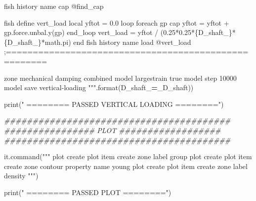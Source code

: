 \documentclass[a4paper, nobind]{templates/ociamthesis}
\newenvironment{Shaded}{\begin{snugshade}}{\end{snugshade}}
\newcommand{\BuiltInTok}[1]{#1}
\newcommand{\CommentTok}[1]{\textcolor[rgb]{0.56,0.35,0.01}{\textit{#1}}}
\newcommand{\NormalTok}[1]{#1}
\newcommand{\OperatorTok}[1]{\textcolor[rgb]{0.81,0.36,0.00}{\textbf{#1}}}
\newcommand{\SpecialCharTok}[1]{\textcolor[rgb]{0.00,0.00,0.00}{#1}}
\newcommand{\StringTok}[1]{\textcolor[rgb]{0.31,0.60,0.02}{#1}}
\renewenvironment{Shaded}
{
  \vspace{10pt}%
  \begin{snugshade}%
}{%
  \end{snugshade}%
  \vspace{8pt}%
}
\begin{document}
\begin{Shaded}
\begin{Highlighting}[]
\StringTok{fish history name \textquotesingle{}cap\textquotesingle{} @find\_cap}

\StringTok{fish define vert\_load}
\StringTok{    local yftot = 0.0}
\StringTok{    loop foreach gp cap}
\StringTok{        yftot = yftot + gp.force.unbal.y(gp)}
\StringTok{    end\_loop}
\StringTok{    vert\_load = yftot / (0.25*0.25*}\SpecialCharTok{\{D\_shaft\_\}}\StringTok{*}\SpecialCharTok{\{D\_shaft\_\}}\StringTok{*math.pi)}
\StringTok{end}
\StringTok{fish history name \textquotesingle{}load\textquotesingle{} @vert\_load}
\StringTok{;=====================================================}

\StringTok{zone mechanical damping combined}
\StringTok{model largestrain true}
\StringTok{model step 10000}
\StringTok{model save \textquotesingle{}vertical{-}loading\textquotesingle{}}
\StringTok{"""}\NormalTok{.}\BuiltInTok{format}\NormalTok{(D\_shaft\_}\OperatorTok{=}\NormalTok{\_D\_shaft))}

\BuiltInTok{print}\NormalTok{(}\StringTok{"               ======== PASSED VERTICAL LOADING ========"}\NormalTok{)}

\CommentTok{\#\#\#\#\#\#\#\#\#\#\#\#\#\#\#\#\#\#\#\#\#\#\#\#\#\#\#\#\#\#\#\#\#\#\#\#\#\#\#\#}
\CommentTok{\#\#\#\#\#\#\#\#\#\#\#\#\#\#\#\# PLOT \#\#\#\#\#\#\#\#\#\#\#\#\#\#\#\#\#\#}
\CommentTok{\#\#\#\#\#\#\#\#\#\#\#\#\#\#\#\#\#\#\#\#\#\#\#\#\#\#\#\#\#\#\#\#\#\#\#\#\#\#\#\#}

\NormalTok{it.command(}\StringTok{"""}
\StringTok{plot create}
\StringTok{plot item create zone label group}
\StringTok{plot create}
\StringTok{plot item create zone contour property name \textquotesingle{}young\textquotesingle{}}
\StringTok{plot create}
\StringTok{plot item create zone label density}
\StringTok{"""}\NormalTok{)}

\BuiltInTok{print}\NormalTok{(}\StringTok{"               ======== PASSED PLOT ========"}\NormalTok{)}












































\end{Highlighting}
\end{Shaded}
\end{document}
